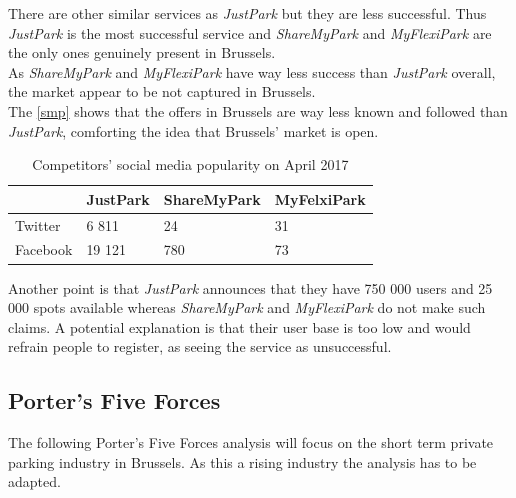 \documentclass[12pt,a4paper,oneside]{book}
\begin{document}
There are other similar services as \textit{JustPark} but they are less successful. Thus \textit{JustPark} is the most successful service and \textit{ShareMyPark} and \textit{MyFlexiPark} are the only ones genuinely present in Brussels.\\
As \textit{ShareMyPark} and \textit{MyFlexiPark} have way less success than \textit{JustPark} overall, the market appear to be not captured in Brussels.\\
The \autoref{smp} shows that the offers in Brussels are way less known and followed than \textit{JustPark}, comforting the idea that Brussels' market is open.

\begin{table}[h]
\centering
\caption{Competitors' social media popularity on April 2017}
\label{smp}
\begin{tabular}{l|l|l|l|}
\cline{2-4}
                               & JustPark & ShareMyPark & MyFelxiPark \\ \hline
\multicolumn{1}{|l|}{Twitter}  & 6 811    & 24          & 31          \\ \hline
\multicolumn{1}{|l|}{Facebook} & 19 121   & 780         & 73          \\ \hline
\end{tabular}
\end{table}

Another point is that \textit{JustPark} announces that they have 750 000 users\cite{jpu} and 25 000 spots available\cite{jpd} whereas \textit{ShareMyPark} and \textit{MyFlexiPark} do not make such claims. A potential explanation is that their user base is too low and would refrain people to register, as seeing the service as unsuccessful.



\subsection{Porter’s Five Forces}
The following Porter's Five Forces analysis will focus on the short term private parking industry in Brussels. As this a rising industry the analysis has to be adapted.\\
\end{document}
